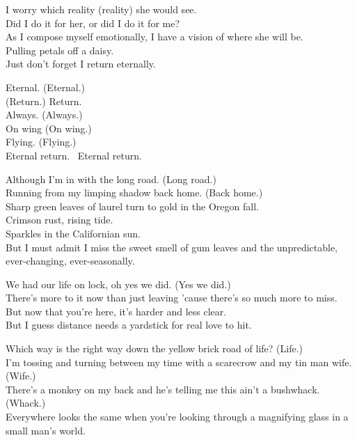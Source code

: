 I worry which reality (reality) she would see. \\
Did I do it for her, or did I do it for me? \\
As I compose myself emotionally, I have a vision of where she will be. \\
Pulling petals off a daisy. \\
Just don't forget I return eternally. \\


Eternal. (Eternal.) \\
(Return.) Return. \\
Always. (Always.) \\
On wing (On wing.) \\
Flying. (Flying.) \\
Eternal return. \
Eternal return. \\


Although I'm in  with the long road. (Long road.) \\
Running from my limping shadow back home. (Back home.) \\
Sharp green leaves of laurel turn to gold in the Oregon fall. \\
Crimson rust, rising tide. \\
Sparkles in the Californian sun. \\
But I must admit I miss the sweet smell of gum leaves and the unpredictable, ever-changing, ever-seasonally. \\


We had our life on lock, oh yes we did. (Yes we did.) \\
There's more to it now than just leaving 'cause there's so much more to miss. \\
But now that you're here, it's harder and less clear. \\
But I guess distance needs a yardstick for real love to hit. \\


Which way is the right way down the yellow brick road of life? (Life.) \\
I'm tossing and turning between my time with a scarecrow and my tin man wife. (Wife.) \\
There's a monkey on my back and he's telling me this ain't a bushwhack. (Whack.) \\
Everywhere looks the same when you're looking through a magnifying glass in a small man's world. \\

